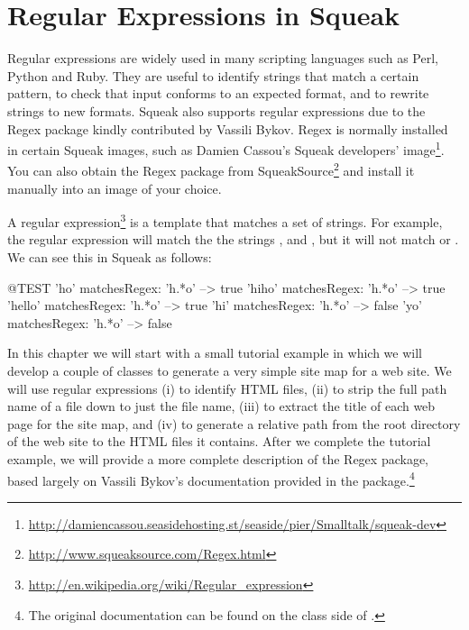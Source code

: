 \documentclass[a4paper,10pt,twoside]{book}
\begin{document}
\fi
\sloppy
\chapter{Regular Expressions in Squeak}\label{cha:regex}

Regular expressions are widely used in many scripting languages such as Perl, Python and Ruby.
They are useful to identify strings that match a certain pattern, to check that input conforms to an expected format, and to rewrite strings to new formats.
Squeak also supports regular expressions due to the Regex package kindly contributed by Vassili Bykov.
Regex is normally installed in certain Squeak images, such as Damien Cassou's Squeak developers' image\footnote{\url{http://damiencassou.seasidehosting.st/seaside/pier/Smalltalk/squeak-dev}}.
You can also obtain the Regex package from SqueakSource\footnote{\url{http://www.squeaksource.com/Regex.html}} and install it manually into an image of your choice.

A regular expression\footnote{\url{http://en.wikipedia.org/wiki/Regular_expression}} is a template that matches a set of strings.
For example, the regular expression  will match the the strings ,  and , but it will not match  or .
We can see this in Squeak as follows:
\begin{code}{@TEST}
'ho' matchesRegex: 'h.*o'     --> true
'hiho' matchesRegex: 'h.*o'  --> true
'hello' matchesRegex: 'h.*o' --> true
'hi' matchesRegex: 'h.*o'      --> false
'yo' matchesRegex: 'h.*o'     --> false
\end{code}

In this chapter we will start with a small tutorial example in which we will develop a couple of classes to generate a very simple site map for a web site.
We will use regular expressions
(i) to identify HTML files,
(ii) to strip the full path name of a file down to just the file name,
(iii) to extract the title of each web page for the site map, and
(iv) to generate a relative path from the root directory of the web site to the HTML files it contains.
After we complete the tutorial example, we will provide a more complete description of the Regex package, based largely on Vassili Bykov's documentation provided in the package.\footnote{The original documentation can be found on the class side of .}
\end{document}
